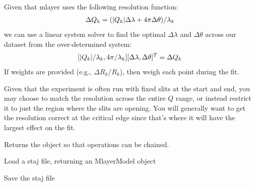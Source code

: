 \documentclass[letterpaper,10pt,english]{sphinxmanual}
\begin{document}
\begin{fulllineitems}
\begin{fulllineitems}
Given that mlayer uses the following resolution function:
\begin{gather}
\begin{split}\Delta Q_k = (|Q_k| \Delta\lambda + 4 \pi \Delta\theta)/\lambda_k\end{split}\notag
\end{gather}
we can use a linear system solver to find the optimal
$\Delta \lambda$ and $\Delta \theta$ across our dataset from the
over-determined system:
\begin{gather}
\begin{split}[|Q_k|/\lambda_k, 4\pi/\lambda_k][\Delta\lambda, \Delta\theta]^T
    = \Delta Q_k\end{split}\notag
\end{gather}
If weights are provided (e.g., $\Delta R_k/R_k$), then weigh each
point during the fit.

Given that the experiment is often run with fixed slits at the
start and end, you may choose to match the resolution across the
entire $Q$ range, or instead restrict it to just the region where
the slits are opening.  You will generally want to get the resolution
correct at the critical edge since that's where it will have the
largest effect on the fit.

Returns the object so that operations can be chained.

\end{fulllineitems}


\begin{fulllineitems}
\label{api/staj:refl1d.staj.MlayerMagnetic.load}
Load a staj file, returning an MlayerModel object

\end{fulllineitems}


\begin{fulllineitems}
\label{api/staj:refl1d.staj.MlayerMagnetic.save}
Save the staj file

\end{fulllineitems}


\begin{fulllineitems}
\label{api/staj:refl1d.staj.MlayerMagnetic.set}
\end{fulllineitems}


\end{fulllineitems}
\end{document}

